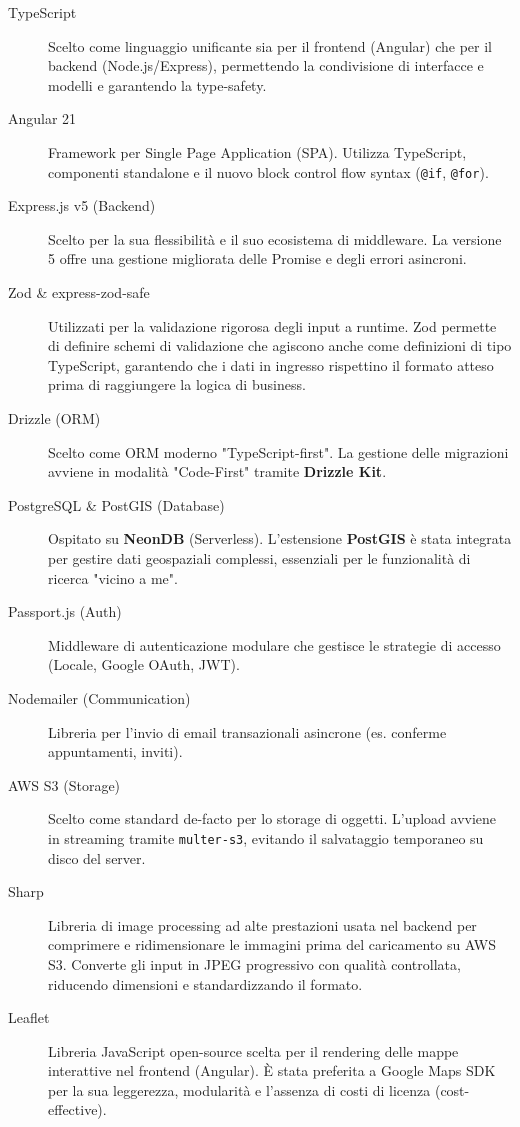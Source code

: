 \begin{description}
    \item[TypeScript] Scelto come linguaggio unificante sia per il frontend (Angular) che per il backend (Node.js/Express), permettendo la condivisione di interfacce e modelli e garantendo la type-safety.
    \item[Angular 21] Framework per Single Page Application (SPA). Utilizza TypeScript, componenti standalone e il nuovo block control flow syntax (\texttt{@if}, \texttt{@for}).
    \item[Express.js v5 (Backend)] Scelto per la sua flessibilità e il suo ecosistema di middleware. La versione 5 offre una gestione migliorata delle Promise e degli errori asincroni.
    \item[Zod \& express-zod-safe] Utilizzati per la validazione rigorosa degli input a runtime. Zod permette di definire schemi di validazione che agiscono anche come definizioni di tipo TypeScript, garantendo che i dati in ingresso rispettino il formato atteso prima di raggiungere la logica di business.
    \item[Drizzle (ORM)] Scelto come ORM moderno "TypeScript-first". La gestione delle migrazioni avviene in modalità "Code-First" tramite \textbf{Drizzle Kit}.
    \item[PostgreSQL \& PostGIS (Database)] Ospitato su \textbf{NeonDB} (Serverless). L'estensione \textbf{PostGIS} è stata integrata per gestire dati geospaziali complessi, essenziali per le funzionalità di ricerca "vicino a me".
    \item[Passport.js (Auth)] Middleware di autenticazione modulare che gestisce le strategie di accesso (Locale, Google OAuth, JWT).
    \item[Nodemailer (Communication)] Libreria per l'invio di email transazionali asincrone (es. conferme appuntamenti, inviti).
    \item[AWS S3 (Storage)] Scelto come standard de-facto per lo storage di oggetti. L'upload avviene in streaming tramite \texttt{multer-s3}, evitando il salvataggio temporaneo su disco del server.
    \item[Sharp] Libreria di image processing ad alte prestazioni usata nel backend per comprimere e ridimensionare le immagini prima del caricamento su AWS S3. Converte gli input in JPEG progressivo con qualità controllata, riducendo dimensioni e standardizzando il formato.
    \item[Leaflet] Libreria JavaScript open-source scelta per il rendering delle mappe interattive nel frontend (Angular). È stata preferita a Google Maps SDK per la sua leggerezza, modularità e l'assenza di costi di licenza (cost-effective).

\end{description}
